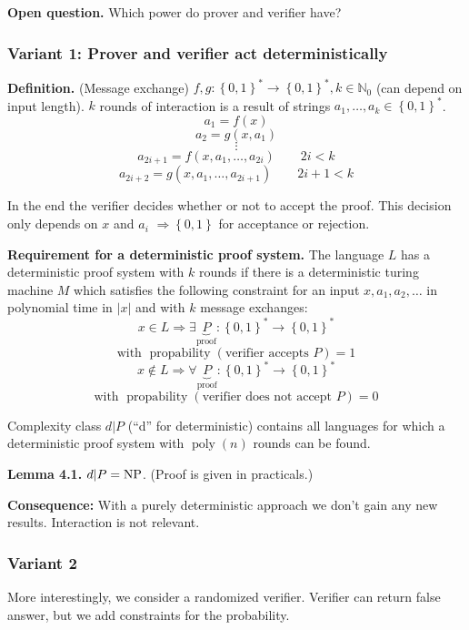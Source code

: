 \documentclass[a4paper]{article}
\newcommand{\cls}[1]{\rm{#1}}
\newcommand{\set}[1]{\left\{#1\right\}}
\begin{document}
\textbf{Open question.}
  Which power do prover and verifier have?

\subsubsection{Variant 1: Prover and verifier act deterministically}
%
\textbf{Definition.} (Message exchange)
  $f, g: \set{0,1}^* \rightarrow \set{0,1}^*, k \in \mathbb{N}_0$
  (can depend on input length). $k$ rounds of interaction is a
  result of strings $a_1, \ldots, a_k \in \set{0,1}^*$.
  \[
    a_1 = f(x)
  \] \[
    a_2 = g(x, a_1)
  \] \[
    \vdots
  \] \[
    a_{2i + 1} = f(x, a_1, \ldots, a_{2i}) \qquad 2i < k
  \] \[
    a_{2i + 2} = g(x, a_1, \ldots, a_{2i + 1}) \qquad 2i + 1 < k
  \]

In the end the verifier decides whether or not to accept the proof.
This decision only depends on $x$ and $a_i$ $\Rightarrow \set{0,1}$
for acceptance or rejection.

\textbf{Requirement for a deterministic proof system.}
The language $L$ has a deterministic proof system with $k$ rounds
if there is a deterministic turing machine $M$ which satisfies
the following constraint for an input $x, a_1, a_2, \ldots$ in
polynomial time in $|x|$ and with $k$ message exchanges:
\[
  x \in L \Rightarrow \exists \underbrace{P}_{\text{proof}}:
    \set{0,1}^* \rightarrow \set{0,1}^*
\] \[
  \text{with } \operatorname{propability}(\text{verifier accepts }P) = 1
\] \[
  x \notin L \Rightarrow \forall \underbrace{P}_{\text{proof}}:
    \set{0,1}^* \rightarrow \set{0,1}^*
\] \[
  \text{with } \operatorname{propability}(\text{verifier does not accept }P) = 0  %
\]

Complexity class $d | P$ (``d'' for deterministic) contains all
languages for which a deterministic proof system with
$\operatorname{poly}(n)$ rounds can be found.

\textbf{Lemma 4.1.} $d | P = \cls{NP}$. (Proof is given in practicals.)

\textbf{Consequence:}
With a purely deterministic approach we don't gain any new results.
Interaction is not relevant.

\subsubsection{Variant 2}
%
More interestingly, we consider a randomized verifier.
Verifier can return false answer, but we add constraints for the
probability.
\end{document}
